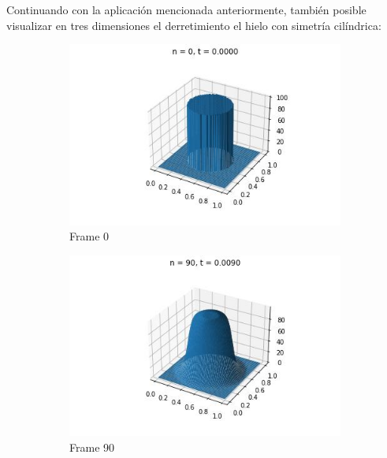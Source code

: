 \documentclass{article}
\begin{document}
Continuando con la aplicación mencionada anteriormente, también posible visualizar en tres dimensiones el derretimiento el hielo con simetría cilíndrica:

\begin{figure} [H]
  \centering
  \begin{subfigure}{0.3\linewidth}
    \centering
    \includegraphics[width=\linewidth]{Polar/3D/0.jpg}
    \caption{Frame 0}
  \end{subfigure}
  \begin{subfigure}{0.3\linewidth}
    \centering
    \includegraphics[width=\linewidth]{Polar/3D/90.jpg}
    \caption{Frame 90}
  \end{subfigure}
  \begin{subfigure}{0.3\linewidth}
    \centering

\end{subfigure}
\end{figure}
\end{document}
